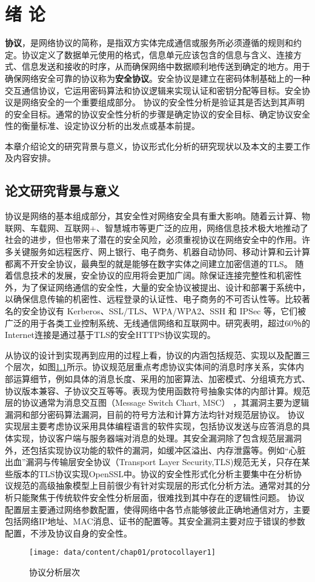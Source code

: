 \chapter{绪 论}

\textbf{协议}，是网络协议的简称，是指双方实体完成通信或服务所必须遵循的规则和约定。协议定义了数据单元使用的格式，信息单元应该包含的信息与含义、连接方式、信息发送和接收的时序，从而确保网络中数据顺利地传送到确定的地方。用于确保网络安全可靠的协议称为\textbf{安全协议}。安全协议是建立在密码体制基础上的一种交互通信协议，它运用密码算法和协议逻辑来实现认证和密钥分配等目标。安全协议是网络安全的一个重要组成部分。
协议的安全性分析是验证其是否达到其声明的安全目标。通常的协议安全性分析的步骤是确定协议的安全目标、确定协议安全性的衡量标准、设定协议分析的出发点或基本前提。

本章介绍论文的研究背景与意义，协议形式化分析的研究现状以及本文的主要工作及内容安排。
\section{论文研究背景与意义}
协议是网络的基本组成部分，其安全性对网络安全具有重大影响。随着云计算、物联网、车载网、互联网+、智慧城市等更广泛的应用，网络信息技术极大地推动了社会的进步，但也带来了潜在的安全风险，必须重视协议在网络安全中的作用。许多关键服务如远程医疗、网上银行、电子商务、机器自动协同、移动计算和云计算都离不开安全协议，最典型的就是能够在数字实体之间建立加密信道的TLS。 随着信息技术的发展，安全协议的应用将会更加广阔。除保证连接完整性和机密性外，为了保证网络通信的安全性，大量的安全协议被提出、设计和部署于系统中，以确保信息传输的机密性、远程登录的认证性、电子商务的不可否认性等。比较著名的安全协议有 Kerberos、SSL/TLS、WPA/WPA2、SSH 和 IPSec 等，它们被广泛的用于各类工业控制系统、无线通信网络和互联网中。研究表明，超过60％的Internet连接是通过基于TLS的安全HTTPS协议实现的\cite{10.1145/2674005.2674991,8406957}。


从协议的设计到实现再到应用的过程上看，协议的内涵包括规范、实现以及配置三个层次，如图\ref{fig-layer}所示。协议规范层重点考虑协议实体间的消息时序关系，实体内部运算细节，例如具体的消息长度、采用的加密算法、加密模式、分组填充方式、协议版本兼容、子协议交互等等。表现为使用函数符号抽象实体的内部计算。规范层的协议通常为消息交互图（Message  Switch Chart, MSC） ，其漏洞主要为逻辑漏洞和部分密码算法漏洞，目前的符号方法和计算方法均针对规范层协议。
协议实现层主要考虑协议采用具体编程语言的软件实现，包括协议发送与应答消息的具体实现，协议客户端与服务器端对消息的处理。其安全漏洞除了包含规范层漏洞外，还包括实现协议功能的软件的漏洞，如缓冲区溢出、内存泄露等。例如“心脏出血”漏洞与传输层安全协议（Transport Layer Security,TLS)规范无关，只存在某些版本的TLS协议实现OpenSSL中。协议的安全性形式化分析主要集中在分析协议规范的高级抽象模型上目前很少有针对实现层的形式化分析方法。通常对其的分析只能聚焦于传统软件安全性分析层面，很难找到其中存在的逻辑性问题。
协议配置层主要通过网络参数配置，使得网络中各节点能够彼此正确地通信对方，主要包括网络IP地址、MAC消息、证书的配置等。其安全漏洞主要对应于错误的参数配置，不涉及协议自身的安全性。
\begin{figure}[htp]
\centering\texttt{[image: data/content/chap01/protocollayer1]}
\caption{协议分析层次}
\label{fig-layer}
\end{figure}

